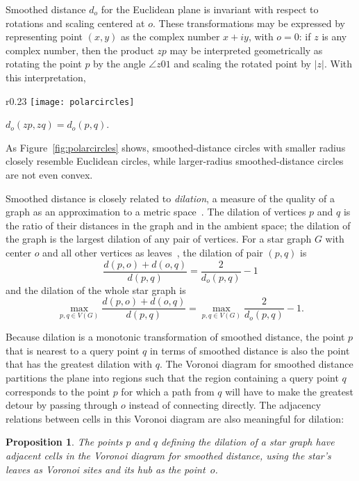 \documentclass[10pt, conference, compsocconf]{IEEEtran}
\newtheorem{proposition}[theorem]{Proposition}
\begin{document}
Smoothed distance $d_o$ for the Euclidean plane is invariant with respect to rotations and scaling centered at $o$. These transformations may be expressed by representing point $(x,y)$ as the complex number $x+iy$, with $o=0$: if $z$ is any complex number, then the product $zp$ may be interpreted geometrically as rotating the point $p$ by the angle $\angle z01$ and scaling the rotated point by $|z|$. With this interpretation,
\begin{wrapfigure}{r}{0.23\textwidth}
\centering\texttt{[image: polarcircles]}
\caption{Concentric circles for smoothed distance in the Euclidean plane, with $o=(0,0)$, $p=(1,0)$, and radii 0.5, 0.6, 0.7, 0.8, and 0.9}
\label{fig:polarcircles}
\end{wrapfigure}
$d_o(zp,zq)=d_o(p,q)$.

As Figure~\ref{fig:polarcircles}
shows, smoothed-distance circles with smaller radius closely resemble Euclidean circles, while larger-radius smoothed-distance circles are not even convex.

Smoothed distance is closely related to \emph{dilation}, a measure of the quality of a graph as an approximation to a metric space~\cite{Epp-HCG-00}. The dilation of vertices $p$ and $q$ is the ratio of their distances in the graph and in the ambient space; the dilation of the graph is the largest dilation of any pair of vertices. For a star graph $G$ with center $o$ and all other vertices as leaves~\cite{EppWor-CGTA-07}, the dilation of pair $(p,q)$ is
$$\frac{d(p,o)+d(o,q)}{d(p,q)} = \frac{2}{d_o(p,q)}-1$$
and the dilation of the whole star graph is
$$\max_{p,q\in V(G)}\frac{d(p,o)+d(o,q)}{d(p,q)} = \max_{p,q\in V(G)}\frac{2}{d_o(p,q)}-1.$$

Because dilation is a monotonic transformation of smoothed distance, the point $p$ that is nearest to a query point $q$ in terms of smoothed distance is also the point that has the greatest dilation with $q$. The Voronoi diagram for smoothed distance partitions the plane into regions such that the region containing a query point $q$ corresponds to the point $p$ for which a path from $q$ will have to make the greatest detour by passing through $o$ instead of connecting directly. The adjacency relations between cells in this Voronoi diagram are also meaningful for dilation:

\begin{proposition}
\label{prop:dilation-neighbors}
The points $p$ and $q$ defining the dilation of a star graph have adjacent cells in the Voronoi diagram for smoothed distance, using the star's leaves as Voronoi sites and its hub as the point~$o$.
\end{proposition}
\end{document}
